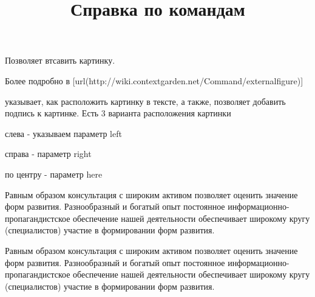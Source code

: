 \title{Справка по командам}

\subject{}

Позволяет втсавить картинку.

 \hfill
\startTEX
{}
\stopTEX
\stopdescr

 \hfill
\startCODERESULT
{}
\stopCODERESULT
\stopdescr

\startTEX
{}
\stopTEX


Более подробно в
[url(http://wiki.contextgarden.net/Command/externalfigure)]

\subject{}

 указывает, как расположить картинку в тексте, а также,
позволяет добавить подпись к картинке. Есть 3 варианта расположения картинки

\startitemize
\item слева - указываем параметр left
\item справа - параметр right
\item по центру - параметр here
\stopitemize

 \hfill
\startTEX
{}

Равным образом консультация с широким активом
позволяет оценить значение форм
развития. Разнообразный и богатый опыт постоянное
информационно-пропагандистское обеспечение нашей
деятельности обеспечивает широкому кругу
(специалистов) участие в формировании форм
развития.
\stopTEX
\stopdescr

 \hfill
{}

Равным образом консультация с широким активом
позволяет оценить значение форм
развития. Разнообразный и богатый опыт постоянное
информационно-пропагандистское обеспечение нашей
деятельности обеспечивает широкому кругу
(специалистов) участие в формировании форм
развития.
\stopdescr

